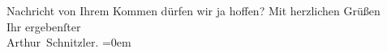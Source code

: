 \begin{ledgroupsized}[t]{13cm}
                    Nachricht von Ihrem Kommen dürfen wir ja hoffen?\pend
           \pstart
           Mit herzlichen Grüßen{\\[\baselineskip]}Ihr ergebenſter{\\[\baselineskip]}\spacefill\mbox{Arthur Schnitzler.}\pend
           \leftskip=0em{}\endnumbering{}\end{ledgroupsized}  \newcommand{\dateiname}{L00757}\newcommand{\titel}{Arthur Schnitzler an Georg Brandes, 31. 12. 1897}\newcommand{\editorInnen}{Martin Anton Müller und Gerd-Hermann Susen}
      